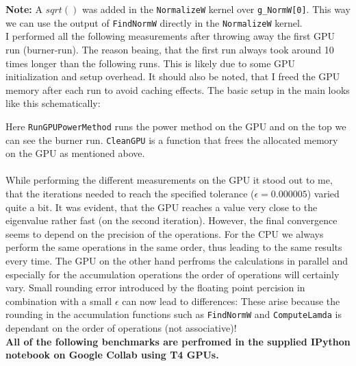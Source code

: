 \textbf{Note:} A $sqrt()$ was added in the \texttt{NormalizeW} kernel over \texttt{g\_NormW[0]}. This way we can use the output of \texttt{FindNormW} directly in the \texttt{NormalizeW} kernel.\\


I performed all the following measurements after throwing away the first GPU run (burner-run). The reason beaing, that the first run always took around 10 times longer than the following runs. This is likely due to some GPU initialization and setup overhead. It should also be noted, that I freed the GPU memory after each run to avoid caching effects. The basic setup in the main looks like this schematically: 

Here \texttt{RunGPUPowerMethod} runs the power method on the GPU and on the top we can see the burner run. \texttt{CleanGPU} is a function that frees the allocated memory on the GPU as mentioned above.\\

\\
While performing the different measurements on the GPU it stood out to me, that the iterations needed to reach the specified tolerance ($\epsilon = 0.000005$) varied quite a bit. It was evident, that the GPU reaches a value very close to the eigenvalue rather fast (on the second iteration). However, the final convergence seems to depend on the precision of the operations. For the CPU we always perform the same operations in the same order, thus leading to the same results every time. The GPU on the other hand perfroms the calculations in parallel and especially for the accumulation operations the order of operations will certainly vary. Small rounding error introduced by the floating point percision in combination with a small $\epsilon$ can now lead to differences: These arise because the rounding in the accumulation functions such as \texttt{FindNormW} and \texttt{ComputeLamda} is dependant on the order of operations (not associative)!\\

\textbf{All of the following benchmarks are perfromed in the supplied IPython notebook on Google Collab using T4 GPUs.}\\ 

